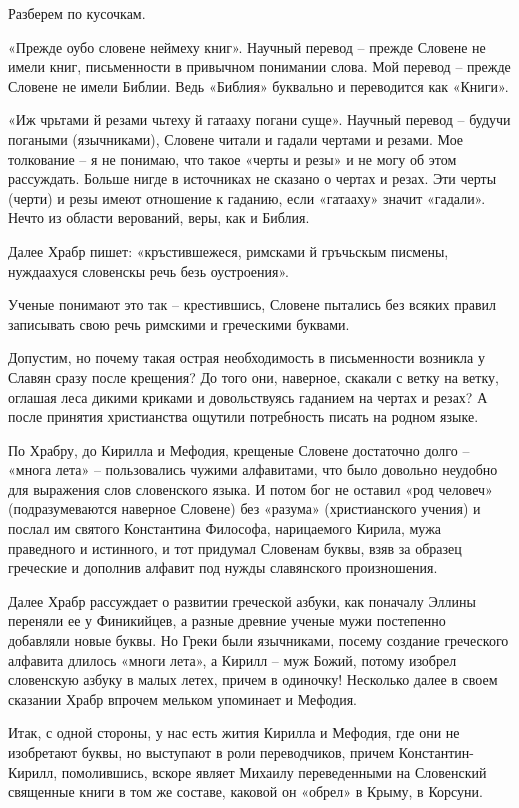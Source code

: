 Разберем по кусочкам.

«Прежде оубо словене неймеху книг». Научный перевод – прежде Словене не имели книг, письменности в привычном понимании слова. Мой перевод – прежде Словене не имели Библии. Ведь «Библия» буквально и переводится как «Книги». 

«Иж чрьтами й резами чьтеху й гатааху погани суще». Научный перевод – будучи погаными (язычниками), Словене читали и гадали чертами и резами. Мое толкование – я не понимаю, что такое «черты и резы» и не могу об этом рассуждать. Больше нигде в источниках не сказано о чертах и резах. Эти черты (черти) и резы имеют отношение к гаданию, если «гатааху» значит «гадали». Нечто из области верований, веры, как и Библия.

Далее Храбр пишет: «кръстившежеся, римсками й гръчьскым писмены, нуждаахуся словенскы речь безь оустроения».

Ученые понимают это так – крестившись, Словене пытались без всяких правил записывать свою речь римскими и греческими буквами.

Допустим, но почему такая острая необходимость в письменности возникла у Славян сразу после крещения? До того они, наверное, скакали с ветку на ветку, оглашая леса дикими криками и довольствуясь гаданием на чертах и резах? А после принятия христианства ощутили потребность писать на родном языке.

По Храбру, до Кирилла и Мефодия, крещеные Словене достаточно долго – «многа лета» – пользовались чужими алфавитами, что было довольно неудобно для выражения слов словенского языка. И потом бог не оставил «род человеч» (подразумеваются наверное Словене) без «разума» (христианского учения) и послал им святого Константина Философа, нарицаемого Кирила, мужа праведного и истинного, и тот придумал Словенам буквы, взяв за образец греческие и дополнив алфавит под нужды славянского произношения. 

Далее Храбр рассуждает о развитии греческой азбуки, как поначалу Эллины переняли ее у Финикийцев, а разные древние ученые мужи постепенно добавляли новые буквы. Но Греки были язычниками, посему создание греческого алфавита длилось «многи лета», а Кирилл – муж Божий, потому изобрел словенскую азбуку в малых летех, причем в одиночку! Несколько далее в своем сказании Храбр впрочем мельком упоминает и Мефодия.

Итак, с одной стороны, у нас есть жития Кирилла и Мефодия, где они не изобретают буквы, но выступают в роли переводчиков, причем Константин-Кирилл, помолившись, вскоре являет Михаилу переведенными на Словенский священные книги в том же составе, каковой он «обрел» в Крыму, в Корсуни.

